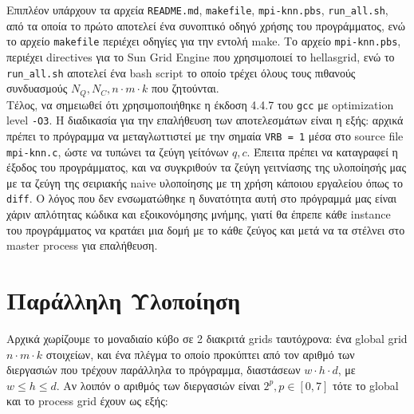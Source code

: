 \documentclass[11pt,a4paper,titlepage]{article}
\begin{document}
	Επιπλέον υπάρχουν τα αρχεία \verb|README.md|, \verb|makefile|, \verb|mpi-knn.pbs|, \verb|run_all.sh|, από τα οποία το πρώτο αποτελεί ένα συνοπτικό οδηγό χρήσης του προγράμματος, ενώ το αρχείο \verb|makefile| περιέχει οδηγίες για την εντολή make. Το αρχείο \verb|mpi-knn.pbs|, περιέχει directives για το Sun Grid Engine που χρησιμοποιεί το hellasgrid, ενώ το \verb|run_all.sh| αποτελεί ένα bash script το οποίο τρέχει όλους τους πιθανούς συνδυασμούς $N_Q, N_C, n \cdot m \cdot k$ που ζητούνται.\\
	
	Τέλος, να σημειωθεί ότι χρησιμοποιήθηκε η έκδοση 4.4.7 του \verb|gcc| με optimization level \verb|-O3|. Η διαδικασία για την επαλήθευση των αποτελεσμάτων είναι η εξής: αρχικά πρέπει το πρόγραμμα να μεταγλωττιστεί με την σημαία \verb|VRB = 1| μέσα στο source file \verb|mpi-knn.c|, ώστε να τυπώνει τα ζεύγη γείτόνων $q, c$. Έπειτα πρέπει να καταγραφεί η έξοδος του προγράμματος, και να συγκριθούν τα ζεύγη γειτνίασης της υλοποίησής μας με τα ζεύγη της σειριακής naive υλοποίησης με τη χρήση κάποιου εργαλείου όπως το \verb|diff|. Ο λόγος που δεν ενσωματώθηκε η δυνατότητα αυτή στο πρόγραμμά μας είναι χάριν απλότητας κώδικα και εξοικονόμησης μνήμης, γιατί θα έπρεπε κάθε instance του προγράμματος να κρατάει μια δομή με το κάθε ζεύγος και μετά να τα στέλνει στο master process για επαλήθευση.
	
	\section{Παράλληλη Υλοποίηση}
	Αρχικά χωρίζουμε το μοναδιαίο κύβο σε 2 διακριτά grids ταυτόχρονα: ένα global grid $ n \cdot m \cdot k$ στοιχείων, και ένα πλέγμα το οποίο προκύπτει από τον αριθμό των διεργασιών που τρέχουν παράλληλα το πρόγραμμα, διαστάσεων $w \cdot h \cdot d$, με $w \leq h \leq d$. Αν λοιπόν ο αριθμός των διεργασιών είναι $2^p, p \in [0, 7]$ τότε το global και το process grid έχουν ως εξής:
	
\end{document}
